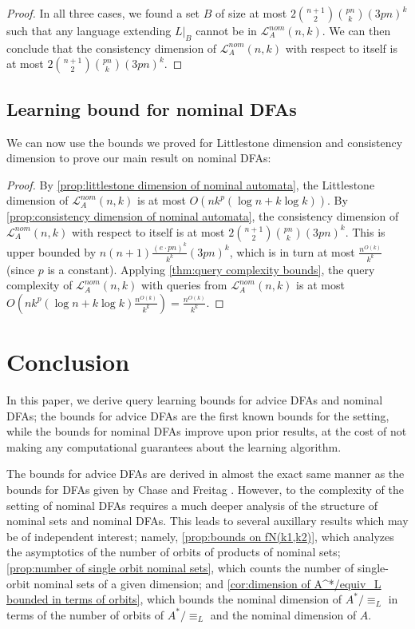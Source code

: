 \documentclass[runningheads]{llncs}
\newcommand{\mc}{\mathcal}
\begin{document}
\begin{proof}
    In all three cases, we found a set $B$ of size at most $2 \binom{n+1}{2} \binom{pn}{k} (3pn)^k$ such that any language extending $L|_B$ cannot be in $\mc L^{nom}_A(n,k)$. 
    We can then conclude that the consistency dimension of $\mc L^{nom}_A(n,k)$ with respect to itself is at most $2 \binom{n+1}{2} \binom{pn}{k} (3pn)^k$.
\end{proof}



\subsection{Learning bound for nominal DFAs}

We can now use the bounds we proved for Littlestone dimension and consistency dimension to prove our main result on nominal DFAs:

\nominalLCfixedalphabet

\begin{proof}
    By \autoref{prop:littlestone dimension of nominal automata}, the Littlestone dimension of $\mc L^{nom}_A(n,k)$ is at most $O\left(nk^{p} \left(\log n + k \log k \right)\right)$. 
    By \autoref{prop:consistency dimension of nominal automata}, the consistency dimension of $\mc L^{nom}_A(n,k)$ with respect to itself is at most $2 \binom{n+1}{2} \binom{pn}{k} (3pn)^k$.
    This is upper bounded by $n(n+1) \frac{(e \cdot pn)^k}{k^k} (3pn)^k$, which is in turn at most $\frac{n^{O(k)}}{k^k}$ (since $p$ is a constant).
    Applying \autoref{thm:query complexity bounds}, the query complexity of $\mc L^{nom}_A(n,k)$ with queries from $\mc L^{nom}_A(n,k)$ is at most $O\left(nk^{p} \left(\log n + k \log k \right) \frac{n^{O(k)}}{k^k}\right) = \frac{n^{O(k)}}{k^k}$.
\end{proof}

\section{Conclusion} \label{section:conclusion}

In this paper, we derive query learning bounds for advice DFAs and nominal DFAs; the bounds for advice DFAs are the first known bounds for the setting, while the bounds for nominal DFAs improve upon prior results, at the cost of not making any computational guarantees about the learning algorithm.

The bounds for advice DFAs are derived in almost the exact same manner as the bounds for DFAs given by Chase and Freitag \cite{chase-freitag:bounds-in-query-learning}. 
However, to the complexity of the setting of nominal DFAs requires a much deeper analysis of the structure of nominal sets and nominal DFAs.
This leads to several auxillary results which may be of independent interest; namely, \autoref{prop:bounds on fN(k1,k2)}, which analyzes the asymptotics of the number of orbits of products of nominal sets; \autoref{prop:number of single orbit nominal sets}, which counts the number of single-orbit nominal sets of a given dimension; and \autoref{cor:dimension of A^*/equiv_L bounded in terms of orbits}, which bounds the nominal dimension of $A^* / \equiv_L$ in terms of the number of orbits of $A^* / \equiv_L$ and the nominal dimension of $A$.
\end{document}
